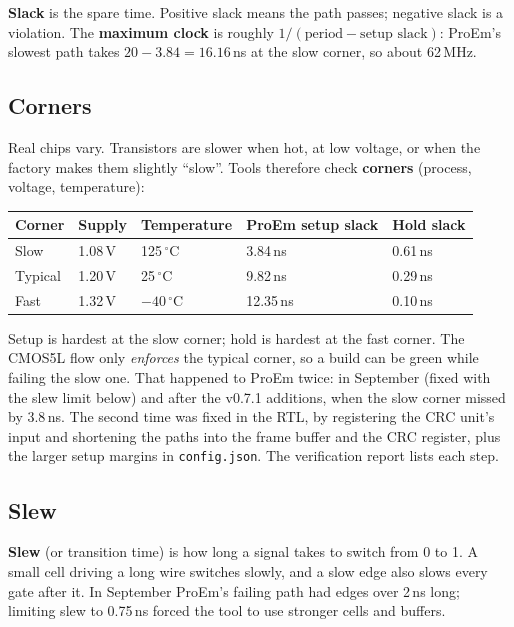 \documentclass[11pt,a4paper]{article}
\newcommand{\file}[1]{\texttt{#1}}
\begin{document}
\textbf{Slack} is the spare time. Positive slack means the path passes; negative slack is a violation. The \textbf{maximum clock} is roughly $1 / (\text{period} - \text{setup slack})$: ProEm's slowest path takes $20 - 3.84 = 16.16$\,ns at the slow corner, so about 62\,MHz.

\subsection{Corners}

Real chips vary. Transistors are slower when hot, at low voltage, or when the factory makes them slightly ``slow''. Tools therefore check \textbf{corners} (process, voltage, temperature):

\begin{center}
\begin{tabular}{@{}lllll@{}}
\toprule
Corner & Supply & Temperature & ProEm setup slack & Hold slack \\
\midrule
Slow & 1.08\,V & 125\,$^\circ$C & 3.84\,ns & 0.61\,ns \\
Typical & 1.20\,V & 25\,$^\circ$C & 9.82\,ns & 0.29\,ns \\
Fast & 1.32\,V & $-40\,^\circ$C & 12.35\,ns & 0.10\,ns \\
\bottomrule
\end{tabular}
\end{center}

Setup is hardest at the slow corner; hold is hardest at the fast corner. The CMOS5L flow only \emph{enforces} the typical corner, so a build can be green while failing the slow one. That happened to ProEm twice: in September (fixed with the slew limit below) and after the v0.7.1 additions, when the slow corner missed by 3.8\,ns. The second time was fixed in the RTL, by registering the CRC unit's input and shortening the paths into the frame buffer and the CRC register, plus the larger setup margins in \file{config.json}. The verification report lists each step.

\subsection{Slew}\label{sec:slew}

\textbf{Slew} (or transition time) is how long a signal takes to switch from 0 to 1. A small cell driving a long wire switches slowly, and a slow edge also slows every gate after it. In September ProEm's failing path had edges over 2\,ns long; limiting slew to 0.75\,ns forced the tool to use stronger cells and buffers.
\end{document}
